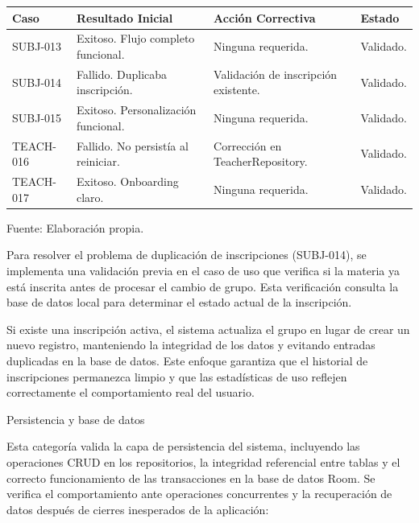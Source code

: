   \begin{center}
  \begin{minipage}{\linewidth}
  \centering
  \begin{tabularx}{\linewidth}{@{}>{\RaggedRight\arraybackslash}p{2.0cm}>{\RaggedRight\arraybackslash}X>{\RaggedRight\arraybackslash}X>{\RaggedRight\arraybackslash}p{1.8cm}@{}}
  \toprule
  Caso & Resultado Inicial & Acción Correctiva & Estado \\
  \midrule
  SUBJ-013 & Exitoso. Flujo completo funcional. & Ninguna requerida. & Validado. \\
  \addlinespace
  SUBJ-014 & Fallido. Duplicaba inscripción. & Validación de inscripción existente. & Validado. \\
  \addlinespace
  SUBJ-015 & Exitoso. Personalización funcional. & Ninguna requerida. & Validado. \\
  \addlinespace
  TEACH-016 & Fallido. No persistía al reiniciar. & Corrección en TeacherRepository. & Validado. \\
  \addlinespace
  TEACH-017 & Exitoso. Onboarding claro. & Ninguna requerida. & Validado. \\
  \bottomrule
  \end{tabularx}
  \label{tab:qa_materias}
  Fuente: Elaboración propia.
  \end{minipage}
  \end{center}
  
  Para resolver el problema de duplicación de inscripciones (SUBJ-014), se implementa una validación previa en el caso de uso que verifica si la materia ya está inscrita antes de procesar el cambio de grupo. Esta verificación consulta la base de datos local para determinar el estado actual de la inscripción.
  
  Si existe una inscripción activa, el sistema actualiza el grupo en lugar de crear un nuevo registro, manteniendo la integridad de los datos y evitando entradas duplicadas en la base de datos. Este enfoque garantiza que el historial de inscripciones permanezca limpio y que las estadísticas de uso reflejen correctamente el comportamiento real del usuario.
  
  \item Persistencia y base de datos
  
  Esta categoría valida la capa de persistencia del sistema, incluyendo las operaciones CRUD en los repositorios, la integridad referencial entre tablas y el correcto funcionamiento de las transacciones en la base de datos Room. Se verifica el comportamiento ante operaciones concurrentes y la recuperación de datos después de cierres inesperados de la aplicación:
  
